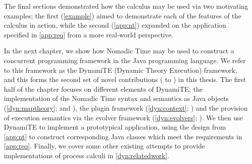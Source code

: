 The final sections demonstrated how the calculus may be used via two
motivating examples; the first (\ref{example}) aimed to demonstrate
each of the features of the calculus in action, while the second
(\ref{app:nt}) expanded on the application specified in \ref{app:req}
from a more real-world perspective.

In the next chapter, we show how Nomadic Time may be used to construct
a concurrent programming framework in the Java programming language.
We refer to this framework as the DynamiTE (Dynamic Theory Execution)
framework, and this forms the second set of novel contributions
( to ) in this thesis.  The first half of the
chapter focuses on different elements of DynamiTE; the implementation
of the Nomadic Time syntax and semantics as Java objects
(\ref{dyn:maptheory};  and ), the plugin framework
(\ref{dyn:context}; ) and the provision of execution
semantics via the evolver framework (\ref{dyn:evolvers}; ).
We then use DynamiTE to implement a prototypical application, using
the design from \ref{app:nt} to construct corresponding Java classes
which meet the requirements in \ref{app:req}.  Finally, we cover some
other existing attempts to provide implementations of process calculi
in \ref{dyn:relatedwork}.

